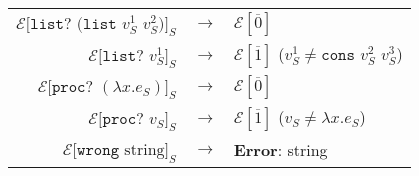 \begin{figure}[p]
\begin{center}
\begin{tabular}{rcl}
$\mathscr{E}[\mathtt{list?}$ $(\mathtt{list}$ $v_{S}^{1}$ $v_{S}^{2})]_{S}$ & $\rightarrow$ & $\mathscr{E}[\overline{0}]$ \\
$\mathscr{E}[\mathtt{list?}$ $v_{S}^{1}]_{S}$ & $\rightarrow$ & $\mathscr{E}[\overline{1}]$ ($v_{S}^{1}\neq\mathtt{cons}$ $v_{S}^{2}$ $v_{S}^{3}$) \\
$\mathscr{E}[\mathtt{proc?}$ $(\lambda x.e_{S})]_{S}$ & $\rightarrow$ & $\mathscr{E}[\overline{0}]$ \\
$\mathscr{E}[\mathtt{proc?}$ $v_{S}]_{S}$ & $\rightarrow$ & $\mathscr{E}[\overline{1}]$ ($v_{S}\neq\lambda x.e_{S}$) \\
$\mathscr{E}[\mathtt{wrong}$ $\mathrm{string}]_{S}$ & $\rightarrow$ & \textbf{Error}: string
\end{tabular}
\end{center}
\end{figure}